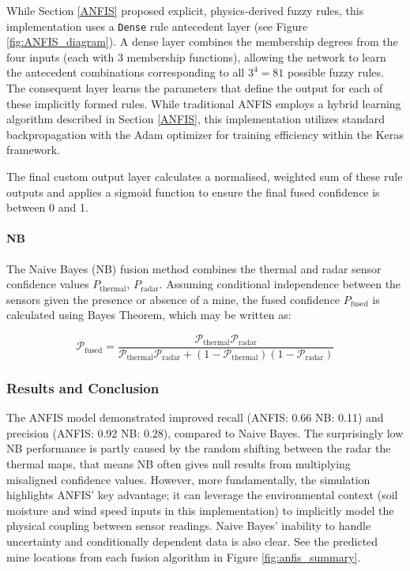     While Section \ref{ANFIS} proposed explicit, physics-derived fuzzy rules, this implementation uses a \texttt{Dense} rule antecedent layer (see Figure \ref{fig:ANFIS_diagram}). A dense layer combines the membership degrees from the four inputs (each with 3 membership functions), allowing the network to learn the antecedent combinations corresponding to all $3^4=81$ possible fuzzy rules. The consequent layer learns the parameters that define the output for each of these implicitly formed rules. While traditional ANFIS employs a hybrid learning algorithm described in Section \ref{ANFIS}, this implementation utilizes standard backpropagation with the Adam optimizer for training efficiency within the Keras framework.
    
    The final custom output layer calculates a normalised, weighted sum of these rule outputs and applies a sigmoid function to ensure the final fused confidence is between 0 and 1.

    \paragraph{NB} The Naive Bayes (NB) fusion method combines the thermal and radar sensor confidence values $P_{\text{thermal}}$, $P_{\text{radar}}$. Assuming conditional independence between the sensors given the presence or absence of a mine, the fused confidence $P_{\text{fused}}$ is calculated using Bayes Theorem, which may be written as:

    \begin{equation}
        \label{eq:bayes_fusion}
        \mathcal{P}_\text{fused} = \frac{\mathcal{P}_\text{thermal}\mathcal{P}_\text{radar}}{\mathcal{P}_\text{thermal}\mathcal{P}_\text{radar} + (1-\mathcal{P}_\text{thermal})(1-\mathcal{P}_\text{radar})}
    \end{equation}
    
\subsubsection{Results and Conclusion}  

    The ANFIS model demonstrated improved recall (ANFIS: 0.66 NB: 0.11) and precision (ANFIS: 0.92 NB: 0.28), compared to Naive Bayes. The surprisingly low NB performance is partly caused by the random shifting between the radar the thermal maps, that means NB often gives null results from multiplying misaligned confidence values. However, more fundamentally, the simulation highlights ANFIS' key advantage; it can leverage the environmental context (soil moisture and wind speed inputs in this implementation) to implicitly model the physical coupling between sensor readings. Naive Bayes' inability to handle uncertainty and conditionally dependent data is also clear. See the predicted mine locations from each fusion algorithm in Figure \ref{fig:anfis_summary}.

